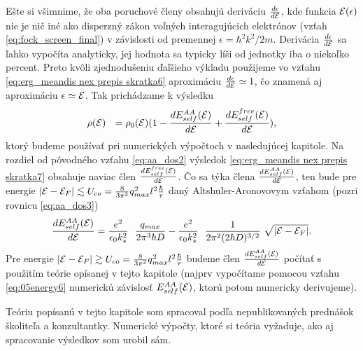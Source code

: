 Ešte si všimnime, že oba poruchové členy obsahujú deriváciu
$\frac{d\epsilon}{d\mathcal{E}}$, kde  funkcia $\mathcal{E}(\epsilon)$ nie je nič iné ako disperzný zákon voľných interagujúcich elektrónov (vzťah \eqref{eq:fock_screen_final}) v závislosti od premennej $\epsilon = \hbar^{2} k^{2}/2m$.
Derivácia $\frac{d\epsilon}{d\mathcal{E}}$ sa ľahko vypočíta analyticky, jej hodnota sa typicky líši od jednotky iba o niekoľko percent. Preto kvôli zjednodušeniu ďaľšieho výkladu použijeme 
vo vzťahu \eqref{eq:erg_meandis nex prepis skratka6} aproximáciu $\frac{d\epsilon}{d\mathcal{E}} \simeq 1$, čo znamená aj aproximáciu $\epsilon \simeq \mathcal{E}$. 
Tak prichádzame k výsledku 
 \begin{equation}\label{eq:erg_meandis nex prepis skratka7}
\rho(\mathcal{E}) \ \ = \rho_0(\mathcal{E}) (1 - \frac{dE_{self}^{AA}(\mathcal{E})}{d\mathcal{E}} + \frac{dE_{self}^{free}(\mathcal{E})}{d\mathcal{E}}) \text{,}
\end{equation}
ktorý budeme používať pri numerických výpočtoch v nasledujúcej kapitole.
Na rozdiel od pôvodného vzťahu \eqref{eq:aa_dos2} výsledok \eqref{eq:erg_meandis nex prepis skratka7} obsahuje naviac člen $\frac{dE_{self}^{free}(\mathcal{E})}{d\mathcal{E}}$.
Čo sa týka člena $\frac{dE_{self}^{AA}(\mathcal{E})}{d\mathcal{E}}$, ten bude 
pre energie $|\mathcal{E}-\mathcal{E}_F| \lesssim  U_{co} = \frac{8}{3\pi^{2}} q_{max}^2 l^2 \frac{\hbar}{\tau}$ daný 
Altshuler-Aronovovym vzťahom (pozri rovnicu \eqref{eq:aa_dos3})
\begin{equation}
 \label{eq:aa_altshuaron}
 \frac{dE_{self}^{AA}(\E)}{d\E} = \frac{e^{2}}{\epsilon_0 k_s^{2}}\ \  \frac{q_{max}}{2\pi^3 \hbar D}
 -  \frac{e^{2}}{\epsilon_0 k_s^{2}} \ \ \frac{1}{2\pi^2 (2\hbar D)^{3/2}}  \ \sqrt{|\E-\E_F|}  \text{.}
\end{equation}
Pre energie $|\mathcal{E}-\mathcal{E}_F| \gtrsim U_{co} = \frac{8}{3\pi^{2}} q_{max}^2 l^2 \frac{\hbar}{\tau}$ budeme  člen $\frac{dE_{self}^{AA}(\mathcal{E})}{d\mathcal{E}}$ počítať s použitím teórie opísanej v tejto kapitole (najprv
vypočítame pomocou vzťahu \eqref{eq:05energy6} numerickú závislosť $E_{self}^{AA}(\mathcal{E})$, ktorú potom numericky derivujeme).  

Teóriu popísanú v tejto kapitole som spracoval podľa nepublikovaných prednášok školiteľa a konzultantky.
Numerické výpočty, ktoré si teória vyžaduje, ako aj spracovanie výsledkov som urobil sám. 